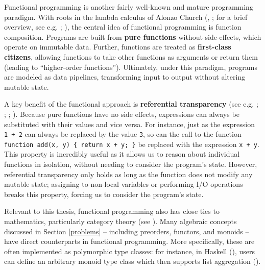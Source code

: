 \documentclass[
  openany]{book}
\theoremstyle{definition}
\theoremstyle{definition}
\theoremstyle{definition}
\theoremstyle{definition}
\theoremstyle{remark}
\begin{document}
Functional programming is another fairly well-known and mature programming paradigm. With roots in the lambda calculus of Alonzo Church (, ; for a brief overview, see e.g. ; ), the central idea of functional programming is function composition. Programs are built from \textbf{pure functions} without side-effects, which operate on immutable data. Further, functions are treated as \textbf{first-class citizens}, allowing functions to take other functions as arguments or return them (leading to ``higher-order functions''). Ultimately, under this paradigm, programs are modeled as data pipelines, transforming input to output without altering mutable state.

A key benefit of the functional approach is \textbf{referential transparency} (see e.g. ; ; ; ). Because pure functions have no side effects, expressions can always be substituted with their values and vice versa. For instance, just as the expression \texttt{1\ +\ 2} can always be replaced by the value \texttt{3}, so can the call to the function \texttt{function\ add(x,\ y)\ \{\ return\ x\ +\ y;\ \}} be replaced with the expression \texttt{x\ +\ y}. This property is incredibly useful as it allows us to reason about individual functions in isolation, without needing to consider the program's state. However, referential transparency only holds as long as the function does not modify any mutable state; assigning to non-local variables or performing I/O operations breaks this property, forcing us to consider the program's state.

Relevant to this thesis, functional programming also has close ties to mathematics, particularly category theory (see ). Many algebraic concepts discussed in Section \ref{problems} -- including preorders, functors, and monoids -- have direct counterparts in functional programming. More specifically, these are often implemented as polymorphic type classes: for instance, in Haskell (), users can define an arbitrary monoid type class which then supports list aggregation ().
\end{document}
